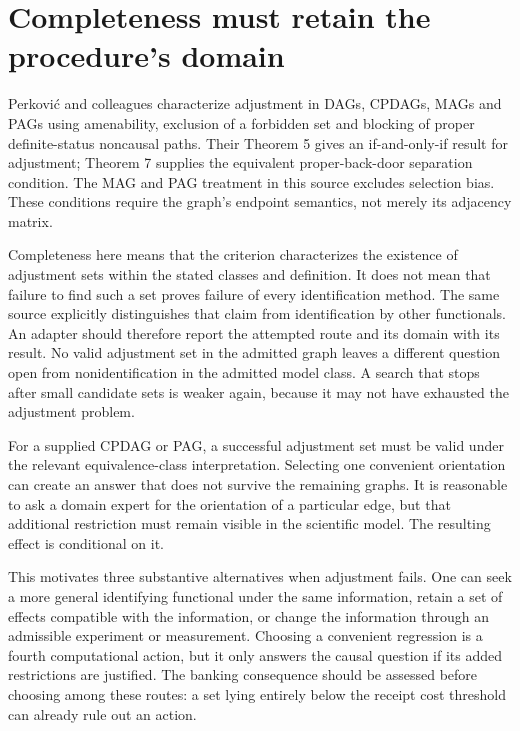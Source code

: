 \section{Completeness must retain the procedure's domain}

Perkovi\'c and colleagues characterize adjustment in DAGs, CPDAGs,
MAGs and PAGs using amenability, exclusion of a forbidden set and blocking
of proper definite-status noncausal paths. Their Theorem 5 gives an
if-and-only-if result for adjustment; Theorem 7 supplies the equivalent
proper-back-door separation condition. The MAG and PAG treatment in this
source excludes selection bias. These conditions require the graph's
endpoint semantics, not merely its adjacency
matrix.\citep{perkovic2018}

Completeness here means that the criterion characterizes the existence
of adjustment sets within the stated classes and definition. It does
not mean that failure to find such a set proves failure of every
identification method. The same source explicitly distinguishes that
claim from identification by other functionals. An adapter should
therefore report the attempted route and its domain with its result.
No valid adjustment set in the admitted graph leaves a different
question open from nonidentification in the admitted model class.
A search that stops after small candidate sets is weaker again,
because it may not have exhausted the adjustment
problem.\citep{perkovic2018}

For a supplied CPDAG or PAG, a successful adjustment set must be valid
under the relevant equivalence-class interpretation. Selecting one
convenient orientation can create an answer that does not survive the
remaining graphs. It is reasonable to ask a domain expert for the
orientation of a particular edge, but that additional restriction must
remain visible in the scientific model. The resulting effect is
conditional on it.

This motivates three substantive alternatives when adjustment fails.
One can seek a more general identifying functional under the same
information, retain a set of effects compatible with the information,
or change the information through an admissible experiment or
measurement. Choosing a convenient regression is a fourth computational
action, but it only answers the causal question if its added
restrictions are justified. The banking consequence should be assessed
before choosing among these routes: a set lying entirely below the
receipt cost threshold can already rule out an action.

